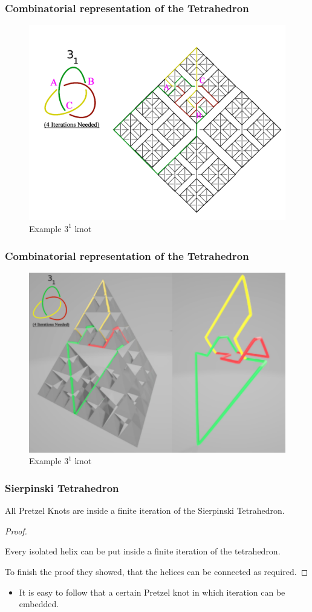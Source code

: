 \begin{frame}
	\frametitle{Combinatorial representation of the Tetrahedron} %
	\begin{figure}[h]
		\centering
		\includegraphics[width=0.5\linewidth]{images/CombRep2}
		\caption{Example $3^1$ knot \cite{broden2024knotsinsidefractals}}
		\label{fig:enter-label}
	\end{figure}
\end{frame}

\begin{frame}
	\frametitle{Combinatorial representation of the Tetrahedron} %
	\begin{figure}[h]
		\centering
		\includegraphics[width=0.5\linewidth]{images/CombRep3}
		\caption{Example $3^1$ knot \cite{broden2024knotsinsidefractals}}
		\label{fig:enter-label}
	\end{figure}
\end{frame}

\begin{frame}
	\frametitle{Sierpinski Tetrahedron} %
	\begin{theorem}
		All Pretzel Knots are inside a finite iteration of the Sierpinski Tetrahedron. \cite{broden2024knotsinsidefractals}
	\end{theorem}
	\begin{proof}
		\begin{lemma}
			Every isolated helix can be put inside a finite iteration of the tetrahedron. \cite{broden2024knotsinsidefractals}
		\end{lemma}
		To finish the proof they showed, that the helices can be connected as required.  
	\end{proof}
	\begin{itemize}
		\item It is easy to follow that a certain Pretzel knot in which iteration can be embedded.
	\end{itemize}
\end{frame}

